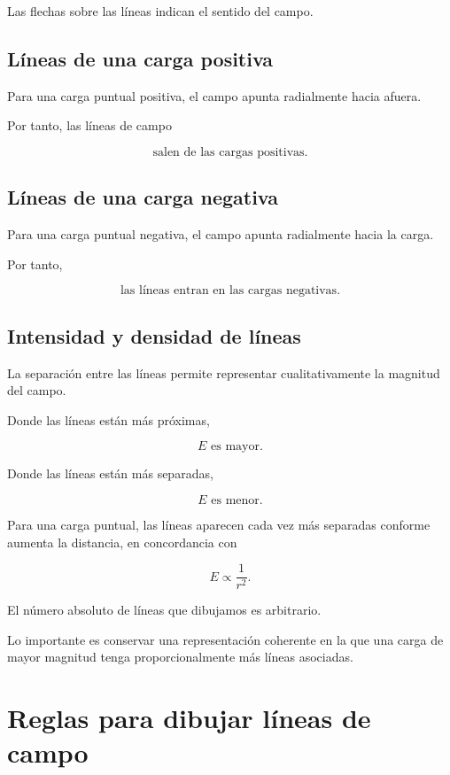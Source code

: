 Las flechas sobre las líneas indican el sentido del campo.


\subsection{Líneas de una carga positiva}

Para una carga puntual positiva, el campo apunta radialmente hacia afuera.

Por tanto, las líneas de campo

\[
\boxed{\text{salen de las cargas positivas}}.
\]


\subsection{Líneas de una carga negativa}

Para una carga puntual negativa, el campo apunta radialmente hacia la carga.

Por tanto,

\[
\boxed{\text{las líneas entran en las cargas negativas}}.
\]


\subsection{Intensidad y densidad de líneas}

La separación entre las líneas permite representar cualitativamente la magnitud del
campo.

Donde las líneas están más próximas,

\[
\boxed{E\text{ es mayor}}.
\]

Donde las líneas están más separadas,

\[
\boxed{E\text{ es menor}}.
\]

Para una carga puntual, las líneas aparecen cada vez más separadas conforme aumenta
la distancia, en concordancia con

\[
E\propto\frac{1}{r^2}.
\]

\begin{advertencia}

El número absoluto de líneas que dibujamos es arbitrario.

Lo importante es conservar una representación coherente en la que una carga de mayor
magnitud tenga proporcionalmente más líneas asociadas.

\end{advertencia}


\section{Reglas para dibujar líneas de campo}

